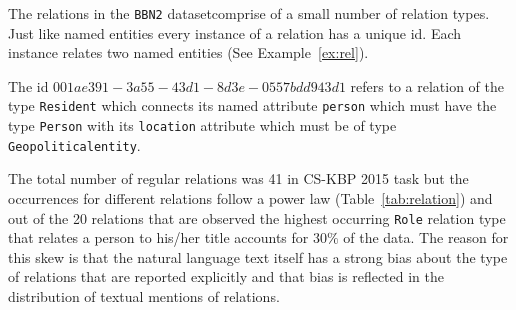 \documentclass[paper=a4,fontsize=11pt]{scrartcl}
\newcommand{\Tabref}[1]{Table~\ref{#1}}
\newcommand{\Exref}[1]{Example~\ref{#1}}
\numberwithin{equation}{section}    %
\numberwithin{figure}{section}      %
\numberwithin{table}{section}       %
\newcommand{\dataset}[0]{\texttt{BBN2} dataset}
\newcommand{\task}{CS-KBP 2015 task\xspace{}}
\begin{document}
The relations in the \dataset comprise of a small number of relation types.
Just like named entities every instance of a relation has a unique id.
Each instance relates two named entities (See \Exref{ex:rel}).
\begin{example}\label{ex:rel}
  The id $001ae391-3a55-43d1-8d3e-0557bdd943d1$ refers to a relation of the
type \texttt{Resident} which connects its named attribute \texttt{person}
which must have the type \texttt{Person}
with its \texttt{location} attribute which must be of type
\texttt{Geopoliticalentity}.
\end{example}
The total number of regular relations was 41 in \task
but the occurrences for different relations follow a power law
(\Tabref{tab:relation}) and  out of the 20 relations that are observed the
highest occurring \texttt{Role} relation type
that relates a person to his/her title accounts for $30\%$ of the data.
The reason for this skew is that the
natural language text itself has a strong bias about the type of relations that are
reported explicitly and that bias is reflected in the distribution of textual mentions
of relations.
\end{document}
